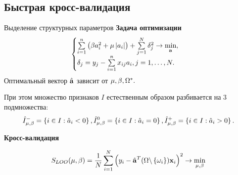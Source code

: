 \documentclass[unicode,lefteqn,c,hyperref={pdfpagelabels=false}]{beamer}
\begin{document}
\subsection{Быстрая кросс-валидация}
\begin{frame}{Выделение структурных параметров}
	\textbf{Задача оптимизации}
	\begin{equation*}
		\begin{cases}
			\sum\limits_{i=1}^n\left(\beta a_i^2 + \mu \left|a_i\right|\right)
			+ \sum\limits_{j=1}^N \delta_j^2 \to \mathop{\mbox{min}}\limits_{\boldsymbol{\mathbf{a}}}, \\
			\delta_j = y_j - \sum\limits_{i=1}^nx_{ij}a_i, j=1,\ldots,N.
		\end{cases}
	\end{equation*}
	Оптимальный вектор $\hat{\boldsymbol{\mathbf{a}}}$ зависит от ${\mu,\beta}, \Omega^*.$

	При этом множество признаков $I$ естественным образом разбивается на 3 подмножества:
	\begin{equation*}
		\hat I^-_{\mu,\beta} = \left\{i\in I: \hat a_{i} < 0\right\},
		\hat I^0_{\mu,\beta} = \left\{i\in I: \hat a_{i} = 0\right\},
		\hat I^+_{\mu,\beta} = \left\{i\in I: \hat a_{i} > 0\right\}.
	\end{equation*}

	\smallskip
	\textbf{Кросс-валидация}

	\begin{equation*}
		S_{LOO}({\mu,\beta}) = \frac1N\sum\limits_{i=1}^N\left(y_i - \hat{\boldsymbol{\mathbf{a}}}^T(\Omega \backslash \left\{\omega_i\right\})\boldsymbol{\mathbf{x}}_i\right)^2 \to \mathop{\mbox{min}}\limits_{{\mu,\beta}}
	\end{equation*}
\end{frame}
\end{document}

